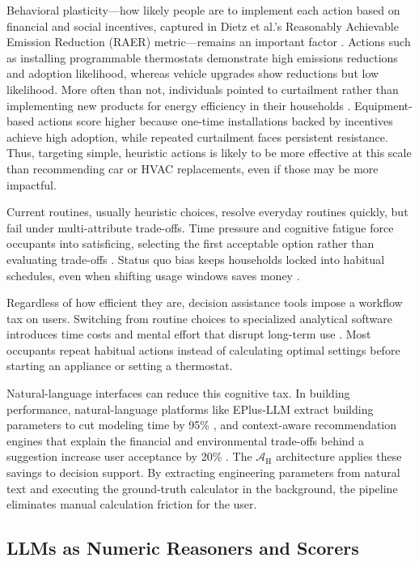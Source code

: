 \documentclass[final,3p,times]{elsarticle}
\begin{document}
Behavioral plasticity---how likely people are to implement each action based on financial and social incentives, captured in Dietz et al.'s Reasonably Achievable Emission Reduction (RAER) metric---remains an important factor \cite{dietz2009}. Actions such as installing programmable thermostats demonstrate high emissions reductions and adoption likelihood, whereas vehicle upgrades show reductions but low likelihood. More often than not, individuals pointed to curtailment rather than implementing new products for energy efficiency in their households \cite{attari2010}. Equipment-based actions score higher because one-time installations backed by incentives achieve high adoption, while repeated curtailment faces persistent resistance. Thus, targeting simple, heuristic actions is likely to be more effective at this scale than recommending car or HVAC replacements, even if those may be more impactful.

Current routines, usually heuristic choices, resolve everyday routines quickly, but fail under multi-attribute trade-offs. Time pressure and cognitive fatigue force occupants into satisficing, selecting the first acceptable option rather than evaluating trade-offs \cite{bobadilla2018,hahn1992}. Status quo bias keeps households locked into habitual schedules, even when shifting usage windows saves money \cite{gill2022}.

Regardless of how efficient they are, decision assistance tools impose a workflow tax on users. Switching from routine choices to specialized analytical software introduces time costs and mental effort that disrupt long-term use \cite{ariely2001,leclerc1995}. Most occupants repeat habitual actions instead of calculating optimal settings before starting an appliance or setting a thermostat. 

Natural-language interfaces can reduce this cognitive tax. In building performance, natural-language platforms like EPlus-LLM extract building parameters to cut modeling time by 95\% \cite{jiang2024eplus}, and context-aware recommendation engines that explain the financial and environmental trade-offs behind a suggestion increase user acceptance by 20\% \cite{zharova2024}. The $\mathcal{A}_{\text{H}}$ architecture applies these savings to decision support. By extracting engineering parameters from natural text and executing the ground-truth calculator in the background, the pipeline eliminates manual calculation friction for the user.

\subsection{LLMs as Numeric Reasoners and Scorers}
\end{document}
